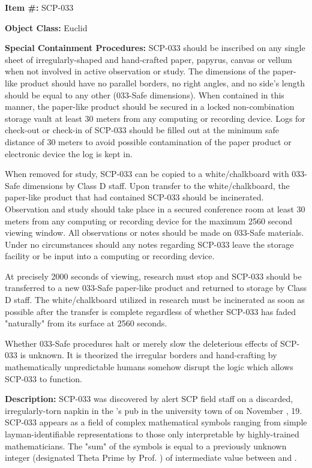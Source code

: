 
\textbf{Item \#:} SCP-033

\textbf{Object Class:} Euclid

\textbf{Special Containment Procedures:} SCP-033 should be inscribed on any single sheet of irregularly-shaped and hand-crafted paper, papyrus, canvas or vellum when not involved in active observation or study. The dimensions of the paper-like product should have no parallel borders, no right angles, and no side's length should be equal to any other (033-Safe dimensions). When contained in this manner, the paper-like product should be secured in a locked non-combination storage vault at least 30 meters from any computing or recording device. Logs for check-out or check-in of SCP-033 should be filled out at the minimum safe distance of 30 meters to avoid possible contamination of the paper product or electronic device the log is kept in.

When removed for study, SCP-033 can be copied to a white/chalkboard with 033-Safe dimensions by Class D staff. Upon transfer to the white/chalkboard, the paper-like product that had contained SCP-033 should be incinerated. Observation and study should take place in a secured conference room at least 30 meters from any computing or recording device for the maximum 2560 second viewing window. All observations or notes should be made on 033-Safe materials. Under no circumstances should any notes regarding SCP-033 leave the storage facility or be input into a computing or recording device.

At precisely 2000 seconds of viewing, research must stop and SCP-033 should be transferred to a new 033-Safe paper-like product and returned to storage by Class D staff. The white/chalkboard utilized in research must be incinerated as soon as possible after the transfer is complete regardless of whether SCP-033 has faded "naturally" from its surface at 2560 seconds.

Whether 033-Safe procedures halt or merely slow the deleterious effects of SCP-033 is unknown. It is theorized the irregular borders and hand-crafting by mathematically unpredictable humans somehow disrupt the logic which allows SCP-033 to function.

\textbf{Description:} SCP-033 was discovered by alert SCP field staff on a discarded, irregularly-torn napkin in the 's  pub in the university town of  on November , 19. SCP-033 appears as a field of complex mathematical symbols ranging from simple layman-identifiable representations to those only interpretable by highly-trained mathematicians. The "sum" of the symbols is equal to a previously unknown integer (designated Theta Prime by Prof. ) of intermediate value between  and .

